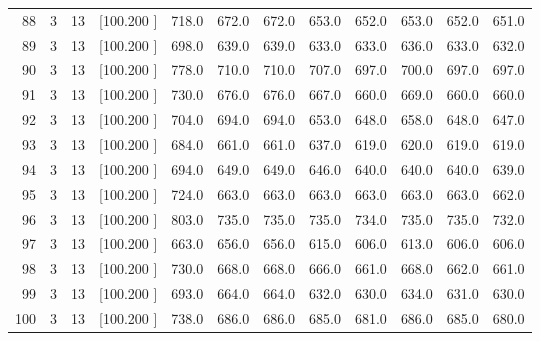\documentclass[12pt,a4paper]{article}
\begin{document}
\begin{center}
{\begin{tabular}{r r r r r r r r r r r r}
  88&  3& 13&[100.200   ]&   718.0&   672.0&   672.0&   653.0&   652.0&   653.0&   652.0&   651.0\\[-0.02in]
  89&  3& 13&[100.200   ]&   698.0&   639.0&   639.0&   633.0&   633.0&   636.0&   633.0&   632.0\\[-0.02in]
  90&  3& 13&[100.200   ]&   778.0&   710.0&   710.0&   707.0&   697.0&   700.0&   697.0&   697.0\\[-0.02in]
  91&  3& 13&[100.200   ]&   730.0&   676.0&   676.0&   667.0&   660.0&   669.0&   660.0&   660.0\\[-0.02in]
  92&  3& 13&[100.200   ]&   704.0&   694.0&   694.0&   653.0&   648.0&   658.0&   648.0&   647.0\\[-0.02in]
  93&  3& 13&[100.200   ]&   684.0&   661.0&   661.0&   637.0&   619.0&   620.0&   619.0&   619.0\\[-0.02in]
  94&  3& 13&[100.200   ]&   694.0&   649.0&   649.0&   646.0&   640.0&   640.0&   640.0&   639.0\\[-0.02in]
  95&  3& 13&[100.200   ]&   724.0&   663.0&   663.0&   663.0&   663.0&   663.0&   663.0&   662.0\\[-0.02in]
  96&  3& 13&[100.200   ]&   803.0&   735.0&   735.0&   735.0&   734.0&   735.0&   735.0&   732.0\\[-0.02in]
  97&  3& 13&[100.200   ]&   663.0&   656.0&   656.0&   615.0&   606.0&   613.0&   606.0&   606.0\\[-0.02in]
  98&  3& 13&[100.200   ]&   730.0&   668.0&   668.0&   666.0&   661.0&   668.0&   662.0&   661.0\\[-0.02in]
  99&  3& 13&[100.200   ]&   693.0&   664.0&   664.0&   632.0&   630.0&   634.0&   631.0&   630.0\\[-0.02in]
 100&  3& 13&[100.200   ]&   738.0&   686.0&   686.0&   685.0&   681.0&   686.0&   685.0&   680.0\\[-0.02in]

\hline
\end{tabular}}
\end{center}
\end{document}
